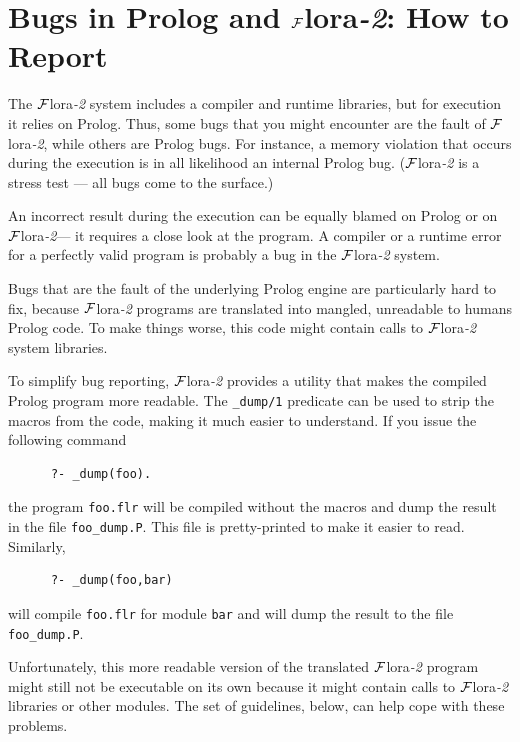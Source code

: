 \documentclass[11pt]{article}
\newcommand{\FLORA}{{\mbox{\sc ${\cal F}${lora}\rm\emph{-2}}}\xspace}
\begin{document}
\section{Bugs in Prolog and \FLORA: How to Report}

The \FLORA system includes a compiler and runtime libraries, but for
execution it relies on Prolog. Thus, some bugs that you might encounter are
the fault of \FLORA, while others are Prolog bugs. For instance, a memory
violation that occurs during the execution is in all likelihood an internal
Prolog bug. (\FLORA is a stress test --- all bugs come to the surface.)

An incorrect result during the execution can be equally blamed on Prolog or
on \FLORA --- it requires a close look at the program. A compiler or
a runtime error for a perfectly valid program is probably a bug in the
\FLORA system.

Bugs that are the fault of the underlying Prolog engine are particularly
hard to fix, because \FLORA programs are translated into mangled,
unreadable to humans Prolog code.  To make things worse, this code might
contain calls to \FLORA system libraries.

To simplify bug reporting, \FLORA provides a utility that makes the compiled
Prolog program more readable. The {\tt \_dump/1}  predicate can be used to strip the
macros from the code, making it much easier to understand. If you issue the
following command
\begin{verbatim}
      ?- _dump(foo).  
\end{verbatim}
the program {\tt foo.flr} will be compiled without the macros and dump the
result in the file {\tt foo\_dump.P}. This file is pretty-printed to make
it easier to read. Similarly,
\begin{verbatim}
      ?- _dump(foo,bar)  
\end{verbatim}
will compile {\tt foo.flr} for module {\tt bar} and will dump the result to
the file {\tt foo\_dump.P}.

Unfortunately, this more readable version of the translated \FLORA program
might still not be executable on its own because it might contain calls to
\FLORA libraries or other modules.  The set of guidelines, below, can help
cope with these problems.
\end{document}
